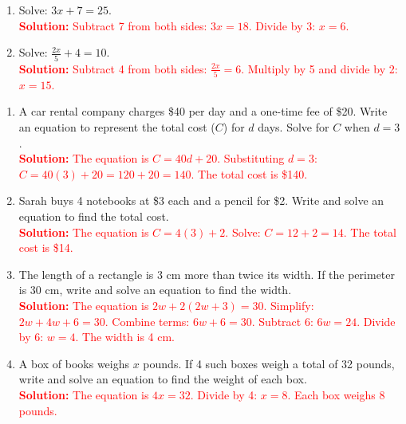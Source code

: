 \documentclass[12pt]{article}
\begin{document}
\begin{tcolorbox}[colframe=black!60, colback=white, 
coltitle=black, colbacktitle=black!15, fonttitle=\bfseries\Large, 
title=Exercises, halign title=center, left=10pt, right=10pt, top=10pt, bottom=60pt]
\begin{enumerate}[itemsep=3em]
    \item Solve: \( 3x + 7 = 25 \).\\
    \textcolor{red}{\textbf{Solution:} Subtract 7 from both sides: \( 3x = 18 \). Divide by 3: \( x = 6 \).}

    \item Solve: \( \frac{2x}{5} + 4 = 10 \).\\
    \textcolor{red}{\textbf{Solution:} Subtract 4 from both sides: \( \frac{2x}{5} = 6 \). Multiply by 5 and divide by 2: \( x = 15 \).}
\end{enumerate}
\end{tcolorbox}

\vspace{1em}

\begin{tcolorbox}[colframe=black!60, colback=white, 
coltitle=black, colbacktitle=black!15, fonttitle=\bfseries\Large, 
title=Problems, halign title=center, left=10pt, right=10pt, top=10pt, bottom=60pt]
\begin{enumerate}[start=9, itemsep=5em]
    \item A car rental company charges \$40 per day and a one-time fee of \$20. Write an equation to represent the total cost (\(C\)) for \(d\) days. Solve for \(C\) when \(d = 3\).\\
    \textcolor{red}{\textbf{Solution:} The equation is \( C = 40d + 20 \). Substituting \( d = 3 \): \( C = 40(3) + 20 = 120 + 20 = 140 \). The total cost is \$140.}

    \item Sarah buys 4 notebooks at \$3 each and a pencil for \$2. Write and solve an equation to find the total cost.\\
    \textcolor{red}{\textbf{Solution:} The equation is \( C = 4(3) + 2 \). Solve: \( C = 12 + 2 = 14 \). The total cost is \$14.}

    \item The length of a rectangle is 3 cm more than twice its width. If the perimeter is 30 cm, write and solve an equation to find the width.\\
    \textcolor{red}{\textbf{Solution:} The equation is \( 2w + 2(2w + 3) = 30 \). Simplify: \( 2w + 4w + 6 = 30 \). Combine terms: \( 6w + 6 = 30 \). Subtract 6: \( 6w = 24 \). Divide by 6: \( w = 4 \). The width is 4 cm.}

    \item A box of books weighs \(x\) pounds. If 4 such boxes weigh a total of 32 pounds, write and solve an equation to find the weight of each box.\\
    \textcolor{red}{\textbf{Solution:} The equation is \( 4x = 32 \). Divide by 4: \( x = 8 \). Each box weighs 8 pounds.}


\end{enumerate}
\end{tcolorbox}
\end{document}
